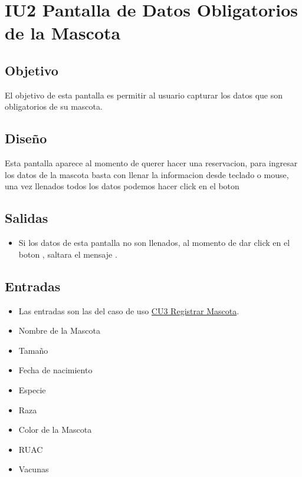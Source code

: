 \section{IU2 Pantalla de Datos Obligatorios de la Mascota }

\subsection{Objetivo}
	\cdtInstrucciones El objetivo de esta pantalla es permitir al usuario capturar los datos que son obligatorios de su mascota.

\subsection{Diseño}
	\cdtInstrucciones Esta pantalla  aparece al momento de querer hacer una reservacion, para ingresar los datos de la mascota basta con llenar la informacion desde teclado o mouse, una vez llenados todos los datos podemos hacer click en el boton    



\subsection{Salidas}

	\begin{itemize}
		\item Si los datos de esta pantalla no son llenados, al momento de dar click en el boton , saltara el mensaje .
	\end{itemize}
	
\subsection{Entradas}
	\begin{itemize}
		\item Las entradas son las del caso de uso \hyperlink{CU3}{CU3 Registrar Mascota}.
		\item Nombre de la Mascota
		\item Tamaño
		\item Fecha de nacimiento
		\item Especie
		\item Raza
		\item Color de la Mascota
		\item RUAC
		\item Vacunas
	\end{itemize}

